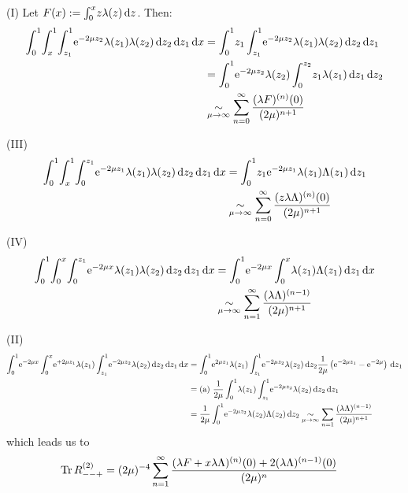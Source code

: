 (I) Let $F(x) := \Integ[x]{0}{z}{z\lambda(z)}$. Then:
\begin{align*}
  \Int{x}{
    \Integ[1]{x}{z_1}{\Integ[1]{z_1}{z_2}{
        \Eto{-2\mu z_2}\lambda(z_1)\lambda(z_2)
      }
    }
  }
  &= \Int{z_1}{z_1 \Integ[1]{z_1}{z_2}{\Eto{-2\mu z_2}\lambda(z_1)\lambda(z_2)}}
  \\
  &= \Int{z_2}{\Eto{-2\mu z_2}\lambda(z_2) \Integ[z_2]{0}{z_1}{z_1\lambda(z_1)}}
  \\
  &\SimMu \Wsum{(\lambda F)^{(n)}}
\end{align*}

(III)
\begin{align*}
  \Int{x}{
    \Integ[1]{x}{z_1}{
      \Integ[z_1]{0}{z_2}{
        \Eto{-2\mu z_1}{\lambda(z_1)\lambda(z_2)}
      }
    }
  }
  &= \Int{z_1}{z_1 \Eto{-2\mu z_1}\lambda(z_1)\Lambda(z_1)} \\
  &\SimMu \Wsum{(z\lambda\Lambda)^{(n)}}
\end{align*}

(IV)
\begin{align*}
  \Int{x}{
    \Integ[x]{0}{z_1}{
      \Integ[z_1]{0}{z_2}{
        \Eto{-2\mu x}\lambda(z_1)\lambda(z_2)
      }
    }
  }
  &= \Int{x}{
    \Eto{-2\mu x} \Integ[x]{0}{z_1}{\lambda(z_1)\Lambda(z_1)}
  } \\
  &\SimMu \sum_{n=1}^\infty \frac{(\lambda\Lambda)^{(n-1)}}{(2\mu)^{n+1}}
\end{align*}

(II)
\begin{align*}
  \Int{x}{
    \Eto{-2\mu x}
    \Integ[x]{0}{z_1}{
      \Eto{+2\mu z_1} \lambda(z_1)
      \Integ[1]{z_1}{z_2}{
        \Eto{-2\mu z_2} \lambda(z_2)
      }
    }
  }
  &= \Int{z_1}{
    \Eto{2\mu z_1}\lambda(z_1)
    \Integ[1]{z_1}{z_2}{
      \Eto{-2\mu z_2}\lambda(z_2)
    }
    \frac{1}{2\mu}\left(\Eto{-2\mu z_1} - \Eto{-2\mu}\right)
  } \\
  &= \text{(a) } \frac{1}{2\mu}
    \Int{z_1}{
      \lambda(z_1)
      \Integ[1]{z_1}{z_2}{
        \Eto{-2\mu z_2}\lambda(z_2)
      }
    } \\
  &= \frac{1}{2\mu} \Int{z_2}{\Eto{-2\mu z_2}\lambda(z_2)\Lambda(z_2)}
    \SimMu \sum_{n=1}\frac{(\lambda \Lambda)^{(n-1)}}{(2\mu)^{n+1}}
\end{align*}
which leads us to
\begin{align*}
  \Tr R_{--+}^{(2)}
  &= (2\mu)^{-4} \sum_{n=1}^{\infty}
  \frac{
    (\lambda F + x\lambda\Lambda)^{(n)}(0)
    + 2(\lambda\Lambda)^{(n-1)}(0)
  }{(2\mu)^n}
\end{align*}


